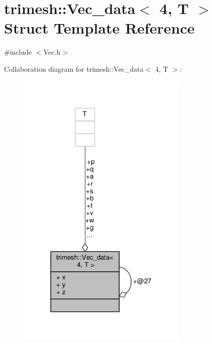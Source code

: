 \hypertarget{structtrimesh_1_1Vec__data_3_014_00_01T_01_4}{}\section{trimesh\+:\+:Vec\+\_\+data$<$ 4, T $>$ Struct Template Reference}
\label{structtrimesh_1_1Vec__data_3_014_00_01T_01_4}


{\ttfamily \#include $<$Vec.\+h$>$}



Collaboration diagram for trimesh\+:\+:Vec\+\_\+data$<$ 4, T $>$\+:\nopagebreak
\begin{figure}[H]
\begin{center}
\leavevmode
\includegraphics[width=231pt]{d6/d47/structtrimesh_1_1Vec__data_3_014_00_01T_01_4__coll__graph}
\end{center}
\end{figure}
